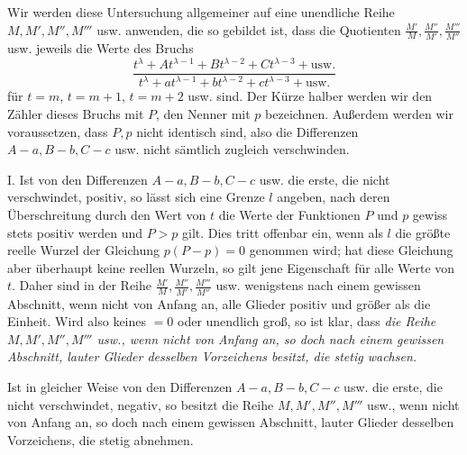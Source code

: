 Wir werden diese Untersuchung allgemeiner auf eine unendliche Reihe $M,\allowbreak M',\allowbreak M'',\allowbreak M'''$ usw. anwenden, die so gebildet ist, dass die Quotienten $\frac{M'}{M},\frac{M''}{M'},\frac{M'''}{M''}$ usw. jeweils die Werte des Bruchs
\[
\frac{t^{\lambda}+At^{\lambda-1}+Bt^{\lambda-2}+Ct^{\lambda-3}+\mathrm{usw.}}
{t^{\lambda}+at^{\lambda-1}+bt^{\lambda-2}+ct^{\lambda-3}+\mathrm{usw.}}
\]
für $t=m$, $t=m+1$, $t=m+2$ usw. sind. Der Kürze halber werden wir den Zähler dieses Bruchs mit $P$, den Nenner mit $p$ bezeichnen. Außerdem werden wir voraussetzen, dass $P,p$ nicht identisch sind, also die Differenzen $A-a,B-b,C-c$ usw. nicht sämtlich zugleich verschwinden.

I. Ist von den Differenzen $A-a,B-b,C-c$ usw. die erste, die nicht verschwindet, positiv, so lässt sich eine Grenze $l$ angeben, nach deren Überschreitung durch den Wert von $t$ die Werte der Funktionen $P$ und $p$ gewiss stets positiv werden und $P>p$ gilt. Dies tritt offenbar ein, wenn als $l$ die größte reelle Wurzel der Gleichung $p(P-p)=0$ genommen wird; hat diese Gleichung aber überhaupt keine reellen Wurzeln, so gilt jene Eigenschaft für alle Werte von $t$. Daher sind in der Reihe $\frac{M'}{M},\frac{M''}{M'},\frac{M'''}{M''}$ usw. wenigstens nach einem gewissen Abschnitt, wenn nicht von Anfang an, alle Glieder positiv und größer als die Einheit. Wird also keines $=0$ oder unendlich groß, so ist klar, dass
\textit{die Reihe $M,M',M'',M'''$ usw., wenn nicht von Anfang an, so doch nach einem gewissen Abschnitt, lauter Glieder desselben Vorzeichens besitzt, die stetig wachsen.}

Ist in gleicher Weise von den Differenzen $A-a,B-b,C-c$ usw. die erste, die nicht verschwindet, negativ, so besitzt die Reihe $M,M',M'',M'''$ usw., wenn nicht von Anfang an, so doch nach einem gewissen Abschnitt, lauter Glieder desselben Vorzeichens, die stetig abnehmen.

